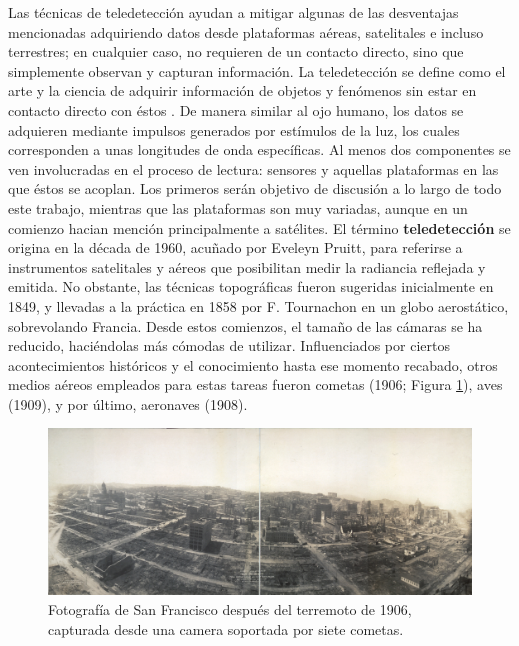 Las técnicas de teledetección ayudan a mitigar algunas de las desventajas mencionadas adquiriendo datos desde plataformas aéreas, satelitales e incluso terrestres; en cualquier caso, no requieren de un contacto directo, sino que simplemente observan y capturan información. La teledetección se define como el arte y la ciencia de adquirir información de objetos y fenómenos sin estar en contacto directo con éstos \cite{lillesand_remote_2015}. De manera similar al ojo humano, los datos se adquieren mediante impulsos generados por estímulos de la luz, los cuales corresponden a unas longitudes de onda específicas. Al menos dos componentes se ven involucradas en el proceso de lectura: sensores y aquellas plataformas en las que éstos se acoplan. Los primeros serán objetivo de discusión a lo largo de todo este trabajo, mientras que las plataformas son muy variadas, aunque en un comienzo hacian mención principalmente a satélites. El término \textbf{teledetección} se origina en la década de 1960, acuñado por Eveleyn Pruitt, para referirse a instrumentos satelitales y aéreos que posibilitan medir la radiancia reflejada y emitida. No obstante, las técnicas topográficas fueron sugeridas inicialmente en 1849, y llevadas a la práctica en 1858 por F. Tournachon en un globo aerostático, sobrevolando Francia. Desde estos comienzos, el tamaño de las cámaras se ha reducido, haciéndolas más cómodas de utilizar. Influenciados por ciertos acontecimientos históricos y el conocimiento hasta ese momento recabado, otros medios aéreos empleados para estas tareas fueron cometas (1906; Figura \ref{fig:san_francisco_kite_spanish}), aves (1909), y por último, aeronaves (1908). 

\begin{figure}[!ht]
	\includegraphics{figs/introduction/san_francisco_kitecamera.jpg}
	\caption{Fotografía de San Francisco después del terremoto de 1906, capturada desde una camera soportada por siete cometas. }
    \label{fig:san_francisco_kite_spanish}
\end{figure}

